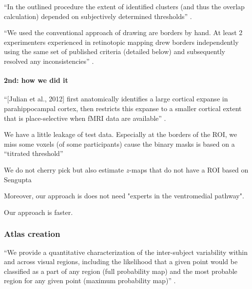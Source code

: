 ``In the outlined procedure the extent of identified clusters (and thus the
overlap calculation) depended on subjectively determined thresholds''
\citep{frost2012measuring}.



``We used the conventional approach of drawing are borders by hand.
%
At least 2 experimenters experienced in retinotopic mapping drew borders
independently using the same set of published criteria (detailed below) and
subsequently resolved any inconsistencies'' \citep{wang2015probabilistic}.

\paragraph{2nd: how we did it}



%
``[Julian et al., 2012] first anatomically identifies a large cortical expanse
in parahippocampal cortex, then restricts this expanse to a smaller cortical
extent that is place-selective when fMRI data are available''
\citep{weiner2018defining}.

%
We have a little leakage of test data.
%
Especially at the borders of the ROI, we miss some voxels (of some participants)
cause the binary masks is based on a ``titrated threshold''
\citep{sengupta2016extension}

%
We do not cherry pick but also estimate $z$-maps that do not have a ROI based on
Sengupta

%
Moreover, our approach is does not need "experts in the ventromedial pathway".

%
Our approach is faster.





\subsubsection{Atlas creation}



``We provide a quantitative characterization of the inter-subject variability
within and across visual regions, including the likelihood that a given point
would be classified as a part of any region (full probability map) and the most
probable region for any given point (maximum probability map)''
\citep{wang2015probabilistic}.

